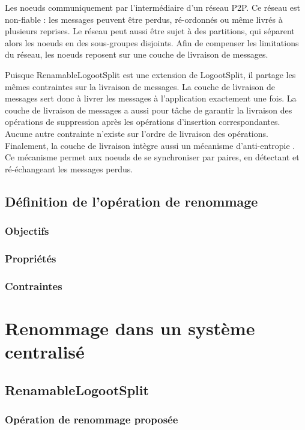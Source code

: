 \documentclass[12pt]{thesul}
\begin{document}
Les noeuds communiquement par l'intermédiaire d'un réseau \ac{P2P}.
Ce réseau est non-fiable : les messages peuvent être perdus, ré-ordonnés ou même livrés à plusieurs reprises.
Le réseau peut aussi être sujet à des partitions, qui séparent alors les noeuds en des sous-groupes disjoints.
Afin de compenser les limitations du réseau, les noeuds reposent sur une couche de livraison de messages.

Puisque RenamableLogootSplit est une extension de LogootSplit, il partage les mêmes contraintes sur la livraison de messages.
La couche de livraison de messages sert donc à livrer les messages à l'application exactement une fois.
La couche de livraison de messages a aussi pour tâche de garantir la livraison des opérations de suppression après les opérations d'insertion correspondantes.
Aucune autre contrainte n'existe sur l'ordre de livraison des opérations.
Finalement, la couche de livraison intègre aussi un mécanisme d'anti-entropie \cite{10.1109/TSE.1983.236733}.
Ce mécanisme permet aux noeuds de se synchroniser par paires, en détectant et ré-échangeant les messages perdus.

\section{Définition de l'opération de renommage}
\subsection{Objectifs}
\subsection{Propriétés}
\subsection{Contraintes} %

\NumberThisInToc
\chapter{Renommage dans un système centralisé}
\minitoc
\section{RenamableLogootSplit}
\subsection{Opération de renommage proposée}
\end{document}

